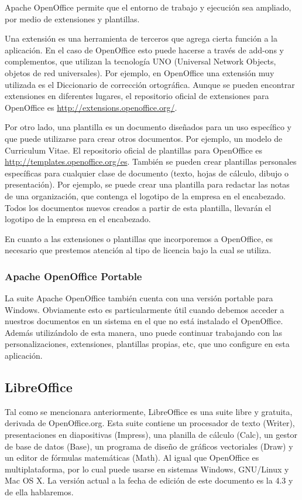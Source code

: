 \documentclass[12pt]{article}
\begin{document}
Apache OpenOffice permite que el entorno de trabajo y ejecución sea ampliado, por medio de extensiones y plantillas.

Una extensión es una herramienta de terceros que agrega cierta función a la aplicación. En el caso de OpenOffice esto puede hacerse a través de add-ons y complementos, que utilizan la tecnología UNO (Universal Network Objects, objetos de red universales). Por ejemplo, en OpenOffice una extensión muy utilizada es el Diccionario de corrección ortográfica. Aunque se pueden encontrar extensiones en diferentes lugares, el repositorio oficial de extensiones para OpenOffice es \url{http://extensions.openoffice.org/}. 

Por otro lado, una plantilla es un documento diseñados para un uso específico y que puede utilizarse para crear otros documentos. Por ejemplo, un modelo de Curriculum Vitae. El repositorio oficial de plantillas para OpenOffice es \url{http://templates.openoffice.org/es}. También se pueden crear plantillas personales específicas para cualquier clase de documento (texto, hojas de cálculo, dibujo o presentación). Por ejemplo, se puede crear una plantilla para redactar las notas de una organización, que contenga el logotipo de la empresa en el encabezado. Todos los documentos nuevos creados a partir de esta plantilla, llevarán el logotipo de la empresa en el encabezado.

En cuanto a las extensiones o plantillas que incorporemos a OpenOffice, es necesario que prestemos atención al tipo de licencia bajo la cual se utiliza.

\subsubsection{Apache OpenOffice Portable}

La suite Apache OpenOffice también cuenta con una versión portable para Windows. Obviamente esto es particularmente útil cuando debemos acceder a nuestros documentos en un sistema en el que no está instalado el OpenOffice. Además utilizándolo de esta manera, uno puede continuar trabajando con las personalizaciones, extensiones, plantillas propias, etc, que uno configure en esta aplicación.

\subsection{LibreOffice}

Tal como se mencionara anteriormente, LibreOffice es una suite libre y gratuita, derivada de OpenOffice.org. Esta suite contiene un procesador de texto (Writer), presentaciones en diapositivas (Impress), una planilla de cálculo (Calc), un gestor de base de datos (Base), un programa de diseño de gráficos vectoriales (Draw) y un editor de fórmulas matemáticas (Math). Al igual que OpenOffice es multiplataforma, por lo cual puede usarse en sistemas Windows, GNU/Linux y Mac OS X. La versión actual a la fecha de edición de este documento es la 4.3 y de ella hablaremos.
\end{document}
